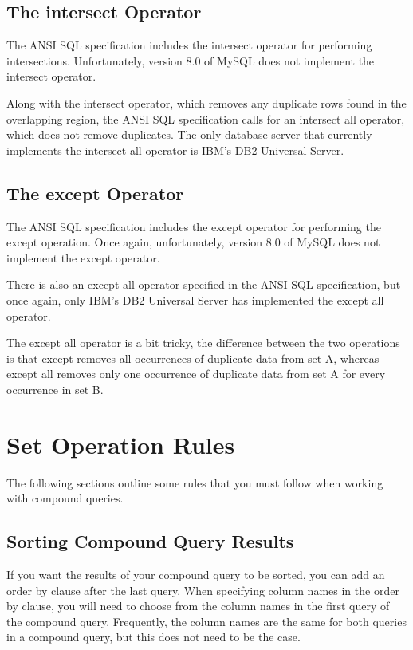 \subsection{The intersect Operator}
The ANSI SQL specification includes the intersect operator for performing intersections. Unfortunately, version 8.0 of MySQL does not implement the intersect operator.

Along with the intersect operator, which removes any duplicate rows found in the overlapping region, the ANSI SQL specification calls for an intersect all operator, which does not remove duplicates. The only database server that currently implements the intersect all operator is IBM’s DB2 Universal Server.

\subsection{The except Operator}
The ANSI SQL specification includes the except operator for performing the except operation. Once again, unfortunately, version 8.0 of MySQL does not implement the except operator.

There is also an except all operator specified in the ANSI SQL specification, but once again, only IBM’s DB2 Universal Server has implemented the except all operator.

The except all operator is a bit tricky, the difference between the two operations is that except removes all occurrences of duplicate data from set A, whereas except all removes only one occurrence of duplicate data from set A for every occurrence in set B.

\section{Set Operation Rules}
The following sections outline some rules that you must follow when working with compound queries.

\subsection{Sorting Compound Query Results}
If you want the results of your compound query to be sorted, you can add an order by clause after the last query. When specifying column names in the order by clause, you will need to choose from the column names in the first query of the compound query. Frequently, the column names are the same for both queries in a compound query, but this does not need to be the case.

